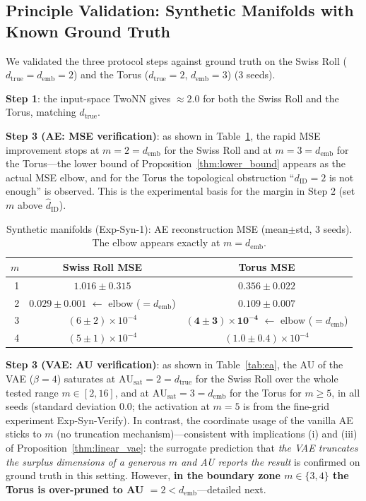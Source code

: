 \documentclass[make,article,submit,pdftex,moreauthors]{Definitions/mdpi}
\newcommand{\dID}{d_{\mathrm{ID}}}
\newcommand{\hatdID}{\hat{d}_{\mathrm{ID}}}
\newcommand{\dtrue}{d_{\mathrm{true}}}
\newcommand{\AUsat}{\mathrm{AU}_{\mathrm{sat}}}
\newcommand{\demb}{d_{\mathrm{emb}}}
\begin{document}
\subsection{Principle Validation: Synthetic Manifolds with Known Ground Truth}\label{sec:exp_syn}

We validated the three protocol steps against ground truth on the Swiss Roll
($\dtrue = \demb = 2$) and the Torus ($\dtrue = 2$, $\demb = 3$)
(3 seeds).

\textbf{Step 1}: the input-space TwoNN gives $\approx 2.0$ for both the
Swiss Roll and the Torus, matching $\dtrue$.

\textbf{Step 3 (AE: MSE verification)}: as shown in Table~\ref{tab:e1}, the
rapid MSE improvement stops at $m = 2 = \demb$ for the Swiss Roll and at
$m = 3 = \demb$ for the Torus---the lower bound of
Proposition~\ref{thm:lower_bound} appears as the actual MSE elbow, and for
the Torus the topological obstruction ``$\dID = 2$ is not enough'' is
observed.
This is the experimental basis for the margin in Step 2 (set $m$ above
$\hatdID$).

\begin{table}[H]
\caption{Synthetic manifolds (Exp-Syn-1): AE reconstruction MSE
(mean$\pm$std, 3 seeds). The elbow appears exactly at $m = \demb$.}
\label{tab:e1}
\small
\begin{tabular}{rcc}
\toprule
$m$ & \textbf{Swiss Roll MSE} & \textbf{Torus MSE} \\
\midrule
1 & $1.016 \pm 0.315$ & $0.356 \pm 0.022$ \\
2 & $\boldsymbol{0.029 \pm 0.001}$ $\leftarrow$ elbow ($= \demb$) & $0.109 \pm 0.007$ \\
3 & $(6 \pm 2) \times 10^{-4}$ & $\boldsymbol{(4 \pm 3) \times 10^{-4}}$ $\leftarrow$ elbow ($= \demb$) \\
4 & $(5 \pm 1) \times 10^{-4}$ & $(1.0 \pm 0.4) \times 10^{-4}$ \\
\bottomrule
\end{tabular}
\end{table}

\textbf{Step 3 (VAE: AU verification)}: as shown in Table~\ref{tab:ea},
the AU of the VAE ($\beta = 4$) saturates at $\AUsat = 2 = \dtrue$ for the
Swiss Roll over the whole tested range $m \in [2, 16]$, and at
$\AUsat = 3 = \demb$ for the Torus for $m \geq 5$, in all seeds (standard
deviation 0.0; the activation at $m = 5$ is from the fine-grid experiment
Exp-Syn-Verify).
In contrast, the coordinate usage of the vanilla AE sticks to $m$ (no
truncation mechanism)---consistent with implications (i) and (iii) of
Proposition~\ref{thm:linear_vae}: the surrogate prediction that \textit{the
VAE truncates the surplus dimensions of a generous $m$ and AU reports the
result} is confirmed on ground truth in this setting.
However, \textbf{in the boundary zone $m \in \{3, 4\}$ the Torus is
over-pruned to AU $= 2 < \demb$}---detailed next.
\end{document}
